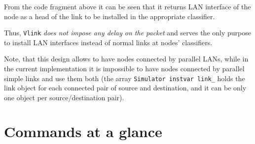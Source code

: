 From the code fragment above it can be seen that it returns LAN
interface of the node as a head of the link to be installed in the
appropriate classifier. 

Thus, {\tt Vlink} \textit{does not impose any delay on the packet}
and serves the only purpose to install LAN interfaces instead of
normal links at nodes' classifiers.  

Note, that this design allows to have nodes connected by parallel
LANs, while in the current implementation it is impossible to have
nodes connected by parallel simple links and use them both (the array
{\tt Simulator instvar link\_} holds the link object for each
connected pair of source and destination, and it can be only one
object per source/destination pair).

\section{Commands at a glance}
\label{sec:lancommand}

